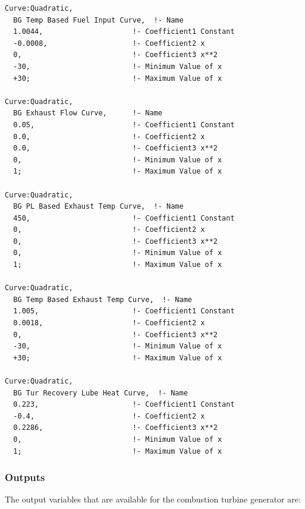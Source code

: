 \begin{lstlisting}
Curve:Quadratic,
  BG Temp Based Fuel Input Curve,  !- Name
  1.0044,                     !- Coefficient1 Constant
  -0.0008,                    !- Coefficient2 x
  0,                          !- Coefficient3 x**2
  -30,                        !- Minimum Value of x
  +30;                        !- Maximum Value of x

Curve:Quadratic,
  BG Exhaust Flow Curve,      !- Name
  0.05,                       !- Coefficient1 Constant
  0.0,                        !- Coefficient2 x
  0.0,                        !- Coefficient3 x**2
  0,                          !- Minimum Value of x
  1;                          !- Maximum Value of x

Curve:Quadratic,
  BG PL Based Exhaust Temp Curve,  !- Name
  450,                        !- Coefficient1 Constant
  0,                          !- Coefficient2 x
  0,                          !- Coefficient3 x**2
  0,                          !- Minimum Value of x
  1;                          !- Maximum Value of x

Curve:Quadratic,
  BG Temp Based Exhaust Temp Curve,  !- Name
  1.005,                      !- Coefficient1 Constant
  0.0018,                     !- Coefficient2 x
  0,                          !- Coefficient3 x**2
  -30,                        !- Minimum Value of x
  +30;                        !- Maximum Value of x

Curve:Quadratic,
  BG Tur Recovery Lube Heat Curve,  !- Name
  0.223,                      !- Coefficient1 Constant
  -0.4,                       !- Coefficient2 x
  0.2286,                     !- Coefficient3 x**2
  0,                          !- Minimum Value of x
  1;                          !- Maximum Value of x
\end{lstlisting}

\subsubsection{Outputs}\label{outputs-6-002}

The output variables that are available for the combustion turbine generator are:

